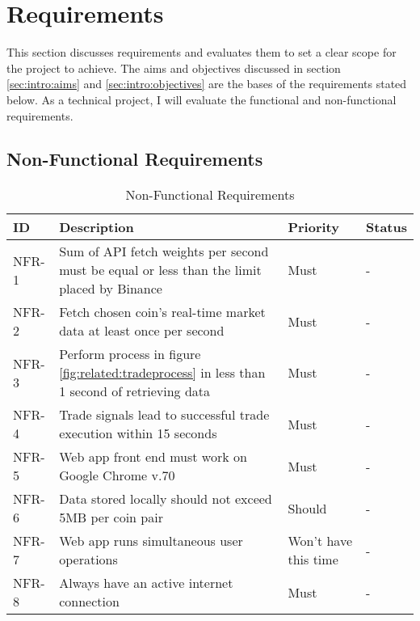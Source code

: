 %
\chapter{Requirements}
\label{sec:requirements}


This section discusses requirements and evaluates them to set a clear scope for the project to achieve. The aims and objectives discussed in section \ref{sec:intro:aims} and \ref{sec:intro:objectives} are the bases of the requirements stated below. As a technical project, I will evaluate the functional and non-functional requirements.



\section{Non-Functional Requirements}
\label{sec:requirements:non_func}


\begin{table}[htb!]
\centering
\begin{tabular}{|l|p{}|p{}|l|}
\hline
\textbf{ID} & \textbf{Description} & \textbf{Priority} & \textbf{Status} \\ \hline\hline
NFR-1 & Sum of API fetch weights per second must be equal or less than the limit placed by Binance & Must & - \\ \hline
NFR-2 & Fetch chosen coin's real-time market data at least once per second & Must & - \\ \hline
NFR-3 & Perform process in figure \ref{fig:related:tradeprocess} in less than 1 second of retrieving data & Must & - \\ \hline
NFR-4 & Trade signals lead to successful trade execution within 15 seconds & Must & - \\\hline
NFR-5 & Web app front end must work on Google Chrome v.70 & Must & - \\\hline
NFR-6 & Data stored locally should not exceed 5MB per coin pair & Should & - \\ \hline
NFR-7 & Web app runs simultaneous user operations & Won't have this time & - \\\hline
NFR-8 & Always have an active internet connection & Must & - \\\hline
\end{tabular}
\caption{Non-Functional Requirements}
\label{table:requirements:non_func}
\end{table}

